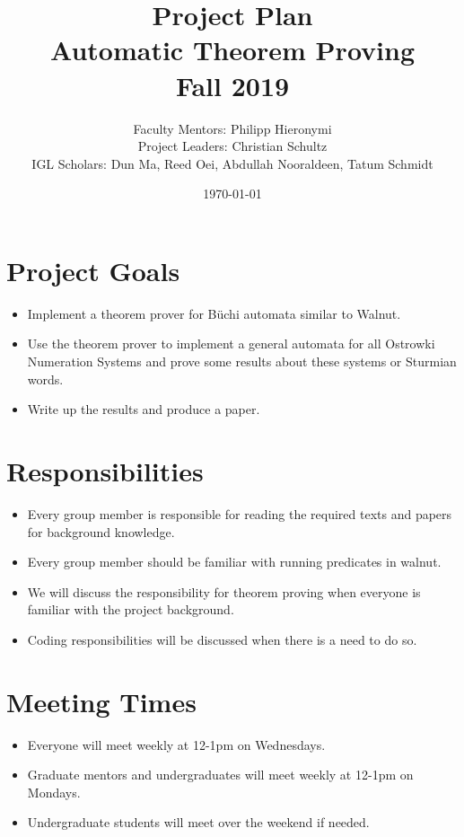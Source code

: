 \documentclass[12pt]{article}
\begin{document}
\title{Project Plan\\ {Automatic Theorem Proving} \\Fall 2019}
\author{Faculty Mentors: {Philipp Hieronymi} \\
	Project Leaders: {Christian Schultz}\\
	IGL Scholars: {Dun Ma, Reed Oei, Abdullah Nooraldeen, Tatum Schmidt }}
\date{\today}
\maketitle
\section{Project Goals}
\begin{itemize} 
\item Implement a theorem prover for B\"uchi automata similar to Walnut.
\item Use the theorem prover to implement a general automata for all Ostrowki Numeration Systems and prove some results about these systems or Sturmian words.
\item Write up the results and produce a paper. 
\end{itemize}

\section{Responsibilities}
\begin{itemize}
\item Every group member is responsible for reading the required texts and papers for background knowledge.
\item Every group member should be familiar with running predicates in walnut. 
\item We will discuss the responsibility for theorem proving when everyone is familiar with the project background.
\item Coding responsibilities will be discussed when there is a need to do so. 

\end{itemize}

\section{Meeting Times}
\begin{itemize}
	\item Everyone will meet weekly at 12-1pm on Wednesdays.
	\item Graduate mentors and undergraduates will meet weekly at 12-1pm on Mondays.
	\item Undergraduate students will meet over the weekend if needed. 
\end{itemize}
\end{document}
